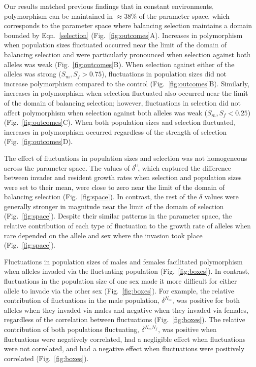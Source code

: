 \begin{refsection}
Our results matched previous findings that in constant environments, polymorphism can be maintained in $ \approx 38\%$ of the parameter space, which corresponds to the parameter space where balancing selection maintains a domain bounded by Eqn.~\ref{selection} (Fig.~\ref{fig:outcomes}A). Increases in polymorphism when population sizes fluctuated occurred near the limit of the domain of balancing selection and were particularly pronounced when selection against both alleles was weak (Fig.~\ref{fig:outcomes}B). When selection against either of the alleles was strong ($ S_{m}, S_{f}> 0.75 $), fluctuations in population sizes did not increase polymorphism compared to the control (Fig.~\ref{fig:outcomes}B). Similarly, increases in polymorphism when selection fluctuated also occurred near the limit of the domain of balancing selection; however, fluctuations in selection did not affect polymorphism when selection against both alleles was weak ($ S_{m}, S_{f}< 0.25 $) (Fig.~\ref{fig:outcomes}C). When both population sizes and selection fluctuated, increases in polymorphism occurred regardless of the strength of selection (Fig.~\ref{fig:outcomes}D).

The effect of fluctuations in population sizes and selection was not homogeneous across the parameter space. The values of $\delta^{0}$, which captured the difference between invader and resident growth rates when selection and population sizes were set to their mean, were close to zero near the limit of the domain of balancing selection (Fig.~\ref{fig:space}). In contrast, the rest of the $\delta$ values were generally stronger in magnitude near the limit of the domain of selection  (Fig.~\ref{fig:space}). Despite their similar patterns in the parameter space, the relative contribution of each type of fluctuation to the growth rate of alleles when rare depended on the allele and sex where the invasion took place (Fig.~\ref{fig:space}).

Fluctuations in population sizes of males and females facilitated polymorphism when alleles invaded via the fluctuating population (Fig.~\ref{fig:boxes}). In contrast, fluctuations in the population size of one sex made it more difficult for either allele to invade via the other sex (Fig.~\ref{fig:boxes}). For example, the relative contribution of fluctuations in the male population, $\delta^{N_{m}}$, was positive for both alleles when they invaded via males and negative when they invaded via females, regardless of the correlation between fluctuations (Fig.~\ref{fig:boxes}). The relative contribution of both populations fluctuating,  $\delta^{N_{m}N_{f}}$, was positive when fluctuations were negatively correlated, had a negligible effect when fluctuations were not correlated, and had a negative effect when fluctuations were positively correlated (Fig.~\ref{fig:boxes}).


\end{refsection}
